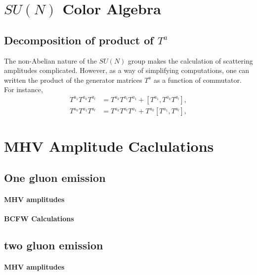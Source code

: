 
\chapter{$SU(N)$ Color Algebra}

\section{Decomposition of product of $T^a$}
\label{decompTa}
The non-Abelian nature of the $SU(N)$ group makes the calculation of scattering amplitudes complicated. However, as a way of simplifying computations, one can written the product of the generator matrices $T^a$ as a function of commutator. For instance,
\begin{align}
T^{a_1}T^{a_k}T^{a_l} &=T^{a_k}T^{a_l}T^{a_1}+[T^{a_1},T^{a_k}T^{a_l}], \\
T^{a_k}T^{a_1}T^{a_l} &=T^{a_k}T^{a_l}T^{a_1}+T^{a_k}[T^{a_1},T^{a_l}],
\end{align}


\chapter{MHV Amplitude Caclulations}


\section{One gluon emission}

\subsubsection{MHV amplitudes}
\label{MHVcalc}

\subsubsection{BCFW Calculations}
\label{BCFW1}


\section{two gluon emission}

\subsubsection{MHV amplitudes}
\label{MHVcalc2}

